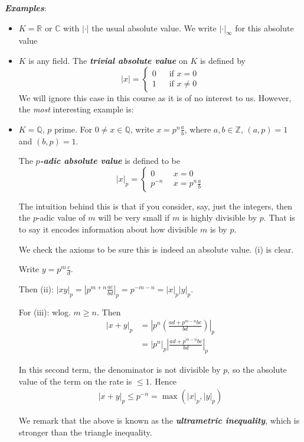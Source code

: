 \documentclass[]{article}
\theoremstyle{custhm}
\theoremstyle{cusdef}
\theoremstyle{custhm}
\theoremstyle{custhm}
\theoremstyle{custhm}
\theoremstyle{cusdef}
\theoremstyle{remark}
\newcommand{\Z}{\mathbb{Z}}
\newcommand{\Q}{\mathbb{Q}}
\newcommand{\R}{\mathbb{R}}
\newcommand{\C}{\mathbb{C}}
\newcommand{\undf}[1]{\textit{\textbf{#1}}}
\renewcommand{\it}[1]{\textit{#1}}
\begin{document}
\undf{Examples}:
\begin{itemize}
	\item $K = \R$ or $\C$ with $|\cdot|$ the usual absolute value. We write $|\cdot|_{\infty}$ for this absolute value
	\item $K$ is any field. The \undf{trivial absolute value} on $K$ is defined by \[|x| = \left\{\begin{array}{cc}0&\ \ \textrm{ if }x = 0\\ 1&\ \ \textrm{ if }x\ne 0\end{array}\right.
	\]
	We will ignore this case in this course as it is of no interest to us. However, the \it{most} interesting example is:
	\item $K = \Q$, $p$ prime. For $0\ne x\in \Q$, write $x = p^n\frac{a}{b}$, where $a,b\in\Z$, $(a,p) = 1$ and $(b,p) = 1$.
	
	The \undf{$p$-adic absolute value} is defined to be
	\[
	|x|_p = \left\{\begin{array}{cc}0 &\ \ x = 0\\ p^{-n}&\ \ x = p^n\frac{a}{b}\end{array}    \right.
	\]
	
	The intuition behind this is that if you consider, say, just the integers, then the $p$-adic value of $m$ will be very small if $m$ is highly divisible by $p$. That is to say it encodes information about how divisible $m$ is by $p$.
	
	We check the axioms to be sure this is indeed an absolute value. (i) is clear.
	
	Write $y = p^m\frac{c}{d}$.
	
	Then (ii): $|xy|_p = \left|p^{m+n}\frac{ac}{bd}\right|_p = p^{-m-n} = |x|_p|y|_p$.
	
	For (iii): wlog. $m\ge n$. Then 
	\begin{align*}
	|x+y|_p &= \left|p^n\left(\frac{ad+p^{m-n}bc}{bd}\right)\right|_p\\
	&= |p^n|_p\left|\frac{ad+p^{m-n}bc}{bd}\right|_p
	\end{align*}

	In this second term, the denominator is not divisible by $p$, so the absolute value of the term on the rate is $\le 1$. Hence
	\begin{align*}
		|x+y|_p \le p^{-n} = \max(|x|_p,|y|_p)
	\end{align*}

	We remark that the above is known as the \undf{ultrametric inequality}, which is stronger than the triangle inequality.
\end{itemize}
\end{document}
